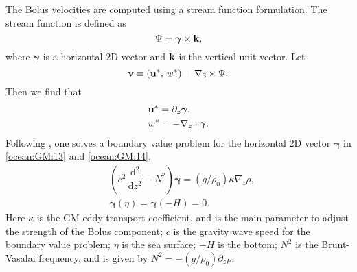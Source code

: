 The Bolus velocities are computed using a stream function formulation.  The stream function is defined as
\begin{equation}
  \label{ocean:GM:10}
  \Psi = \boldsymbol{\gamma}\times{\bf k},
\end{equation}
where $\boldsymbol{\gamma}$ is a horizontal 2D vector and ${\bf k}$ is the
vertical unit vector. Let 
\begin{equation}
  \label{ocean:GM:2}
  {\bf v} \equiv ({\bf u}^\ast,\,w^\ast) = \nabla_3 \times\Psi.
\end{equation}
Then we find that 
\begin{align}
  &{\bf u}^\ast = \partial_z\boldsymbol{\gamma},\label{ocean:GM:13}\\
 &w^\ast = -\nabla_z\cdot\boldsymbol{\gamma}.\label{ocean:GM:14}
\end{align}
Following \cite{Ferrari_ea10om}, one solves a boundary value
problem for the horizontal 2D vector
$\boldsymbol{\gamma}$ in \eqref{ocean:GM:13} and \eqref{ocean:GM:14},
\begin{align}
  &\left( c^2\dfrac{\,\mathrm{d}^2}{\,\mathrm{d} z^2} - N^2\right)\boldsymbol{\gamma} =
  (g/\rho_0)\kappa \nabla_z\rho,\label{ocean:GM:15}\\
  &\boldsymbol{\gamma}(\eta) = \boldsymbol{\gamma}(-H) = 0.\label{ocean:GM:3}
\end{align}
Here $\kappa$ is the GM eddy transport coefficient, and is the main parameter to adjust the strength of the Bolus component; $c$ is the gravity wave speed for the boundary value problem; $\eta$ is the sea surface; $-H$ is the bottom; $N^2$ is the Brunt-Vasalai frequency, and is given by $N^2 = -(g/\rho_0)\partial_z\rho$. 
